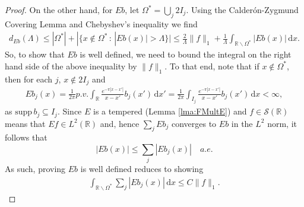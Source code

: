 \documentclass[../dissertation.tex]{subfiles}
\begin{document}
\begin{proof}
    On the other hand, for $Eb$, let $\Omega^* = \bigcup_j 2 I_j$. Using the 
    Calder\'on-Zygmund Covering Lemma and Chebyshev's inequality we find
    \begin{align} \label{eq:dEb}
        d_{Eb}(\Lambda) 
            \leq |\Omega^*| + |\{ x \notin \Omega^* \, : \, |Eb(x)| > \Lambda \}|
            \leq \frac{2}{\Lambda} \|f\|_1 + \frac{1}{\Lambda} 
                \int_{\mathbb R \backslash \Omega^*} |Eb(x)| \, \mathrm{d}x.
    \end{align}
    So, to show that $Eb$ is well defined, we need to bound the integral on the 
    right hand side of the above inequality by $\|f\|_1$. To that end, note that
    if $x \notin \Omega^*$, then for each $j$, $x \notin 2 I_j$ and
    \begin{align*}
        E b_j(x) 
            = \frac{1}{2\pi} 
            	p.v. \int_{\mathbb R} 
            		\frac{e^{-\pi|x - x'|}}{x - x'} b_j(x') 
            	\, \mathrm{d}x'
            = \frac{1}{2\pi} 
            	\int_{I_j} 
            		\frac{e^{-\pi|x - x'|}}{x - x'} b_j(x') 
            	\, \mathrm{d}x 
            < \infty,
    \end{align*}
    as $\text{supp} \, b_j \subseteq I_j$. Since $E$ is a tempered 
    (Lemma \ref{lma:FMultE}) and
    $f \in \mathscr S(\mathbb R)$ means that $Ef \in L^2(\mathbb R)$ and, hence
    $\sum_j E b_j$ converges to $Eb$ in the $L^2$ norm, it follows that
    \[
        |Eb(x)| \leq \sum_j |Eb_j(x)| \quad a.e.
    \]
    As such, proving $Eb$ is well defined reduces to showing
    \begin{align}
        \int_{\mathbb R \backslash \Omega^*} \sum_{j} |E b_j(x)| \, \mathrm{d}x 
            \leq C \| f \|_1.
    \end{align}


\end{proof}
\end{document}
